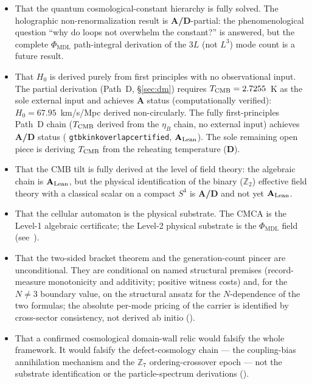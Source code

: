 \documentclass[11pt]{article}
\theoremstyle{remark}
\newcommand{\PHIMDL}{\Phi_{\mathrm{MDL}}}
\newcommand{\ZS}{\mathbb{Z}_7}
\newcommand{\ZT}{\mathbb{Z}_2}
\newcommand{\lean}[1]{%
  \penalty-100
  \begingroup\def\_{\textunderscore\allowbreak}\texttt{#1}\endgroup}
\newcommand{\Hnought}{H_0}
\newcommand{\CMCA}{\text{CMCA}}
\newcommand{\CatA}{\textbf{A}}
\newcommand{\CatAL}{\ensuremath{\textbf{A}_{\rm Lean}}}
\newcommand{\CatAD}{\textbf{A/D}}
\newcommand{\CatD}{\textbf{D}}
\begin{document}
\begin{tcolorbox}[colback=blue!5,colframe=blue!40!black,
  title={\textbf{What this paper does NOT claim}},
  fonttitle=\bfseries,left=6pt,right=6pt,top=5pt,bottom=5pt,breakable]
\small
\begin{itemize}[noitemsep,topsep=2pt]
  \item That the quantum cosmological-constant hierarchy is fully solved. The
        holographic non-renormalization result is \CatAD-partial: the
        phenomenological question ``why do loops not overwhelm the constant?'' is
        answered, but the complete $\PHIMDL$ path-integral derivation of the
        $3L$ (not $L^3$) mode count is a future result.
  \item That $\Hnought$ is derived purely from first principles with no observational
        input. The partial derivation (Path~D, \S\ref{sec:dm}) requires
        $T_{\rm CMB} = 2.7255$~K as the sole external input and achieves \CatA{}
        status (computationally verified): $H_0 = 67.95$~km/s/Mpc derived
        non-circularly. The fully first-principles Path~D chain ($T_{\rm CMB}$
        derived from the $\eta_B$ chain, no external input) achieves \CatAD{}
        status (\lean{gtb\_kink\_overlap\_certified}, \CatAL{}).
        The sole remaining open piece is deriving $T_{\rm CMB}$ from the
        reheating temperature (\CatD{}).
  \item That the CMB tilt is fully derived at the level of field theory: the
        algebraic chain is \CatAL, but the physical identification of the binary
        ($\ZT$) effective field theory with a classical scalar on a compact
        $S^4$ is \CatAD{} and not yet \CatAL.
  \item That the cellular automaton is the physical substrate. The $\CMCA$ is the
        Level-1 algebraic certificate; the Level-2 physical substrate is the
        $\PHIMDL$ field (see~\cite{SpivackCompleteness}).
  \item That the two-sided bracket theorem and the generation-count pincer are
        unconditional. They are conditional on named structural premises
        (record-measure monotonicity and additivity; positive witness costs)
        and, for the $N \neq 3$ boundary value, on the structural ansatz for
        the $N$-dependence of the two formulas; the absolute per-mode pricing
        of the carrier is identified by cross-sector consistency, not derived
        ab initio ().
  \item That a confirmed cosmological domain-wall relic would falsify the whole
        framework. It would falsify the defect-cosmology chain --- the
        coupling-bias annihilation mechanism and the $\ZS$ ordering-crossover
        epoch --- not the substrate identification or the particle-spectrum
        derivations ().
\end{itemize}
\end{tcolorbox}
\end{document}
